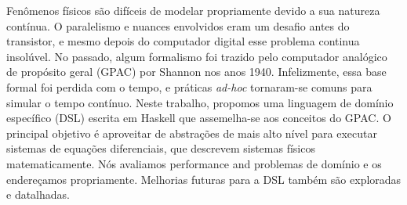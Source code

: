 
Fenômenos físicos são difíceis de modelar propriamente devido a sua natureza contínua. O paralelismo e nuances envolvidos eram um desafio antes do transistor, e mesmo depois do computador digital esse problema continua insolúvel. No passado, algum formalismo foi trazido pelo computador analógico de propósito geral (GPAC) por Shannon nos anos 1940. Infelizmente, essa base formal foi perdida com o tempo, e práticas \textit{ad-hoc} tornaram-se comuns para simular o tempo contínuo. Neste trabalho, propomos uma linguagem de domínio específico (DSL) escrita em Haskell que assemelha-se aos conceitos do GPAC. O principal objetivo é aproveitar de abstrações de mais alto nível para executar sistemas de equações diferenciais, que descrevem sistemas físicos matematicamente. Nós avaliamos performance and problemas de domínio e os endereçamos propriamente. Melhorias futuras para a DSL também são exploradas e datalhadas.
